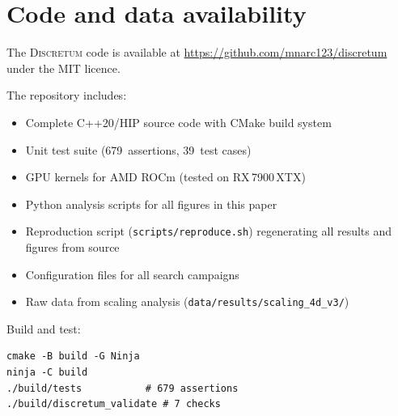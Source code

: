 \documentclass[aps,prd,twocolumn,superscriptaddress,floatfix]{revtex4-2}
\begin{document}
\appendix

\section{Code and data availability}
\label{sec:code}

The \textsc{Discretum} code is available at
\url{https://github.com/mnarc123/discretum}
under the MIT licence.

The repository includes:
\begin{itemize}
\item Complete C++20/HIP source code with CMake build system
\item Unit test suite (679~assertions, 39~test cases)
\item GPU kernels for AMD ROCm (tested on RX\,7900\,XTX)
\item Python analysis scripts for all figures in this paper
\item Reproduction script (\texttt{scripts/reproduce.sh})
  regenerating all results and figures from source
\item Configuration files for all search campaigns
\item Raw data from scaling analysis
  (\texttt{data/results/scaling\_4d\_v3/})
\end{itemize}

Build and test:
\begin{verbatim}
cmake -B build -G Ninja
ninja -C build
./build/tests           # 679 assertions
./build/discretum_validate # 7 checks
\end{verbatim}


\end{document}
